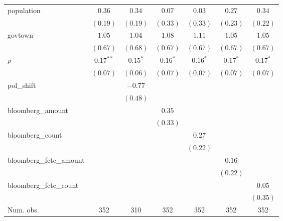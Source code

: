 \begin{table}[!h]
\begin{center}
\begin{tabular}{l c c c c c c }
population              & $0.36$       & $0.34$       & $0.07$       & $0.03$       & $0.27$       & $0.34$       \\
                        & $(0.19)$     & $(0.19)$     & $(0.33)$     & $(0.33)$     & $(0.23)$     & $(0.22)$     \\
govtown                 & $1.05$       & $1.04$       & $1.08$       & $1.11$       & $1.05$       & $1.05$       \\
                        & $(0.67)$     & $(0.68)$     & $(0.67)$     & $(0.67)$     & $(0.67)$     & $(0.67)$     \\
$\rho$                  & $0.17^{**}$  & $0.15^{*}$   & $0.16^{*}$   & $0.16^{*}$   & $0.17^{*}$   & $0.17^{*}$   \\
                        & $(0.07)$     & $(0.06)$     & $(0.07)$     & $(0.07)$     & $(0.07)$     & $(0.07)$     \\
pol\_shift              &              & $-0.77$      &              &              &              &              \\
                        &              & $(0.48)$     &              &              &              &              \\
bloomberg\_amount       &              &              & $0.35$       &              &              &              \\
                        &              &              & $(0.33)$     &              &              &              \\
bloomberg\_count        &              &              &              & $0.27$       &              &              \\
                        &              &              &              & $(0.22)$     &              &              \\
bloomberg\_fctc\_amount &              &              &              &              & $0.16$       &              \\
                        &              &              &              &              & $(0.22)$     &              \\
bloomberg\_fctc\_count  &              &              &              &              &              & $0.05$       \\
                        &              &              &              &              &              & $(0.35)$     \\
\midrule
Num. obs.               & 352          & 310          & 352          & 352          & 352          & 352          \\

\end{tabular}
\end{center}
\end{table}
